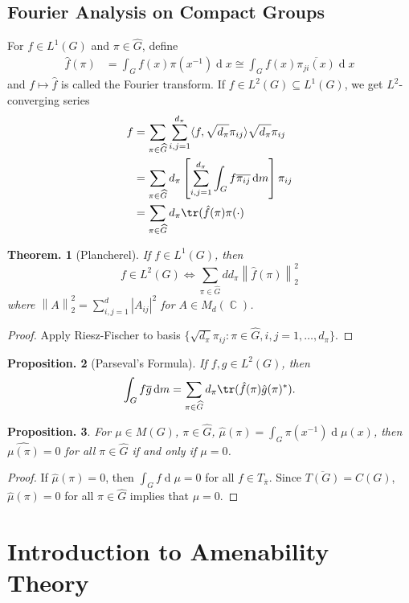 \documentclass[11pt, a4paper]{memoir}
\DeclareMathOperator{\C}{{\mathbb{C}}}
\newcommand{\norm}[1]{\ensuremath{\left\lVert#1\right\rVert}}
\theoremstyle{change}
\newtheorem{theorem}{Theorem.}[section]
\newtheorem{proposition}[theorem]{Proposition.}
\theoremstyle{plain}
\theoremstyle{nonumberplain}
\newtheorem{proof}{Proof}
\renewcommand{\d}[1]{\ensuremath{\operatorname{d}\!{#1}}}
\numberwithin{equation}{section}
\begin{document}
\subsection{Fourier Analysis on Compact Groups}
For $f\in L^1(G)$ and $\pi\in\widehat{G}$, define
\begin{align*}
    \hat{f}(\pi) &= \int_G f(x)\pi(x^{-1})\d{x}\cong\int_Gf(x)\overline{\pi_{ji}(x)}\d{x}
\end{align*}
and $f\mapsto\hat{f}$ is called the Fourier transform.
If $f\in L^2(G)\subseteq L^1(G)$, we get $L^2$-converging series
\begin{align*}
    f &= \sum_{\pi\in\widehat{G}}\sum_{i,j=1}^{d_\pi}\langle f,\sqrt{d_\pi}\pi_{ij}\rangle\sqrt{d_\pi}\pi_{ij}\\
      &= \sum_{\pi\in\widehat{G}}d_\pi\left[\sum_{i,j=1}^{d_\pi}\int_G f\overline{\pi_{ij}}\d{m}\right]\pi_{ij}\\
      &= \sum_{\pi\in\widehat{G}}d_\pi\tr(\hat{f}(\pi)\pi(\cdot)
\end{align*}
\begin{theorem}[Plancherel]
    If $f\in L^1(G)$, then
    \begin{equation*}
        f\in L^2(G)\iff\sum_{\pi\in\widehat{G}}dd_\pi\norm{\hat{f}(\pi)}_2^2
    \end{equation*}
    where $\norm{A}_2^2=\sum_{i,j=1}^d|A_{ij}|^2$ for $A\in M_d(\C)$.
\end{theorem}
\begin{proof}
    Apply Riesz-Fischer to basis $\{\sqrt{d_\pi}\pi_{ij}:\pi\in\widehat{G},i,j=1,\ldots,d_\pi\}$.
\end{proof}
\begin{proposition}[Parseval's Formula]
    If $f,g\in L^2(G)$, then
    \begin{equation*}
        \int_Gf\overline{g}\d{m}=\sum_{\pi\in\widehat{G}}d_{\pi}\tr(\hat{f}(\pi)\hat{g}(\pi)^*).
    \end{equation*}
\end{proposition}
\begin{proposition}
    For $\mu\in M(G)$, $\pi\in\widehat{G}$, $\hat{\mu}(\pi)=\int_G\pi(x^{-1})\d{\mu(x)}$, then $\hat{\mu(\pi)}=0$ for all $\pi\in\widehat{G}$ if and only if $\mu=0$.
\end{proposition}
\begin{proof}
    If $\hat{\mu}(\pi)=0$, then $\int_G f\d{\mu}=0$ for all $f\in T_{\overline{\pi}}$.
    Since $\overline{T(G)}=C(G)$, $\hat{\mu}(\pi)=0$ for all $\pi\in\widehat{G}$ implies that $\mu=0$.
\end{proof}
\section{Introduction to Amenability Theory}
\end{document}
